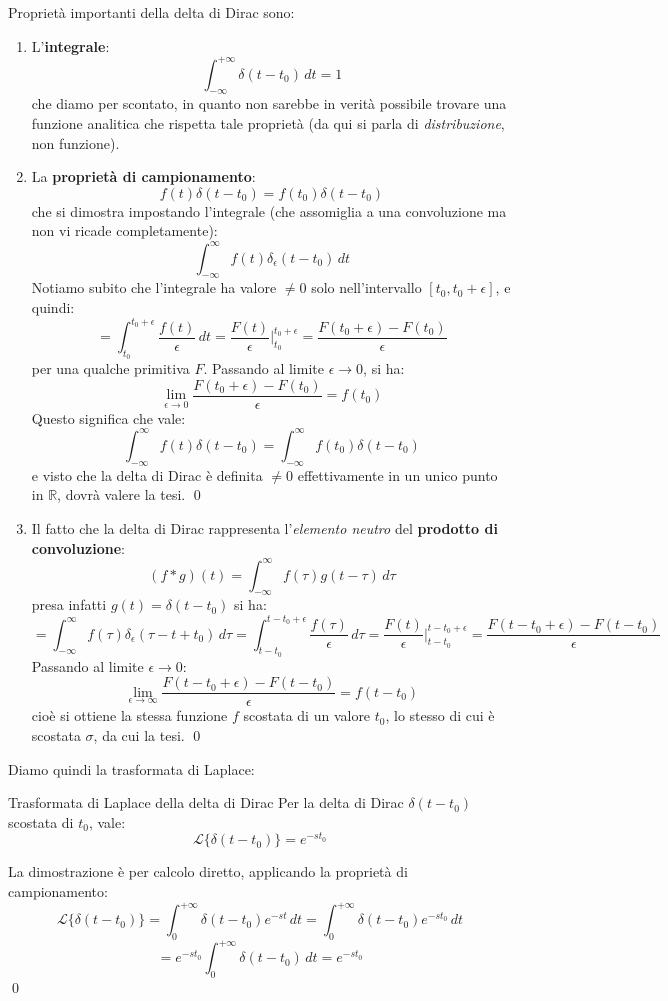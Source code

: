 \documentclass[a4paper,11pt]{article}
\begin{document}
Proprietà importanti della delta di Dirac sono:
\begin{enumerate}
	\item L'\textbf{integrale}:		
		$$
		\int_{-\infty}^{+\infty} \delta(t - t_0) \, dt = 1
		$$
		che diamo per scontato, in quanto non sarebbe in verità possibile trovare una funzione analitica che rispetta tale proprietà (da qui si parla di \textit{distribuzione}, non funzione).
	\item La \textbf{proprietà di campionamento}:	
		$$
		f(t) \delta(t - t_0) = f(t_0) \delta(t - t_0)
		$$
		che si dimostra impostando l'integrale (che assomiglia a una convoluzione ma non vi ricade completamente):
		$$
		\int_{-\infty}^\infty f(t) \delta_\epsilon (t - t_0) \, dt
		$$
		Notiamo subito che l'integrale ha valore $\neq 0$ solo nell'intervallo $[t_0, t_0 + \epsilon]$, e quindi:
		$$
		= \int_{t_0}^{t_0 + \epsilon} \frac{f(t)}{\epsilon} \, dt = \frac{F(t)}{\epsilon} \Bigg|^{t_0 + \epsilon}_{t_0} = \frac{F(t_0 + \epsilon) - F(t_0)}{\epsilon}
		$$
		per una qualche primitiva $F$. Passando al limite $\epsilon \rightarrow 0$, si ha:
		$$
		\lim_{\epsilon \rightarrow 0} \frac{F(t_0 + \epsilon) - F(t_0)}{\epsilon} = f(t_0)
		$$
		Questo significa che vale:
		$$
		\int_{-\infty}^{\infty} f(t) \delta(t - t_0) = \int_{-\infty}^{\infty} f(t_0) \delta(t - t_0)
		$$
		e visto che la delta di Dirac è definita $\neq 0$ effettivamente in un unico punto in $\mathbb{R}$, dovrà valere la tesi. \qed
	\item Il fatto che la delta di Dirac rappresenta l'\textit{elemento neutro} del \textbf{prodotto di convoluzione}:
		$$
		(f * g)(t) = \int_{-\infty}^{\infty} f(\tau) g(t - \tau) \, d\tau
		$$
		presa infatti $g(t) = \delta(t - t_0)$ si ha:
		$$
		= \int_{-\infty}^{\infty} f(\tau) \delta_\epsilon (\tau - t + t_0) \, d\tau = \int_{t - t_0}^{t - t_0 + \epsilon} \frac{f(\tau)}{\epsilon} \, d\tau = \frac{F(t)}{\epsilon} \Bigg|^{t - t_0 + \epsilon}_{t - t_0} = \frac{F(t - t_0 + \epsilon) - F(t - t_0)}{\epsilon}
		$$
		Passando al limite $\epsilon \rightarrow 0$:
		$$
		\lim_{\epsilon \rightarrow \infty} \frac{F(t - t_0 + \epsilon) - F(t - t_0)}{\epsilon} = f(t - t_0)
		$$
		cioè si ottiene la stessa funzione $f$ scostata di un valore $t_0$, lo stesso di cui è scostata $\sigma$, da cui la tesi. \qed
\end{enumerate}

Diamo quindi la trasformata di Laplace:
\begin{theorem}{Trasformata di Laplace della delta di Dirac}
	Per la delta di Dirac $\delta(t - t_0)$ scostata di $t_0$, vale:
	$$
	\mathcal{L}\{\delta(t - t_0)\} = e^{-s t_0}
	$$
\end{theorem}
La dimostrazione è per calcolo diretto, applicando la proprietà di campionamento: 
$$
\mathcal{L}\{\delta(t - t_0)\} = \int_{0}^{+\infty} \delta(t - t_0) e^{-st} \, dt = \int_{0}^{+\infty} \delta(t - t_0) e^{-s t_0} \, dt 
$$
$$
= e^{-s t_0} \int_0^{+\infty} \delta(t - t_0) \, dt = e^{-s t_0}
$$\qed
\end{document}
